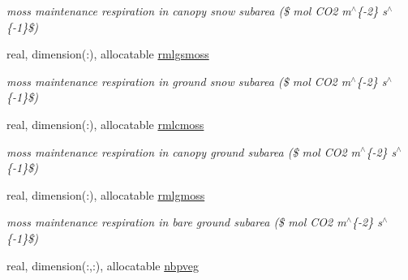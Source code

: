 \begin{DoxyCompactItemize}
\begin{DoxyCompactList}\small\item\em moss maintenance respiration in canopy snow subarea (\$ mol C\+O2 m$^\wedge$\{-\/2\} s$^\wedge$\{-\/1\}\$) \end{DoxyCompactList}\item 
\hypertarget{structctem__statevars_1_1veg__gat_a04946cbc0a0283ebf48af654fe75675a}{}real, dimension(\+:), allocatable \hyperlink{structctem__statevars_1_1veg__gat_a04946cbc0a0283ebf48af654fe75675a}{rmlgsmoss}\label{structctem__statevars_1_1veg__gat_a04946cbc0a0283ebf48af654fe75675a}

\begin{DoxyCompactList}\small\item\em moss maintenance respiration in ground snow subarea (\$ mol C\+O2 m$^\wedge$\{-\/2\} s$^\wedge$\{-\/1\}\$) \end{DoxyCompactList}\item 
\hypertarget{structctem__statevars_1_1veg__gat_a2d27c61781a2828d5e8d2887a41d665e}{}real, dimension(\+:), allocatable \hyperlink{structctem__statevars_1_1veg__gat_a2d27c61781a2828d5e8d2887a41d665e}{rmlcmoss}\label{structctem__statevars_1_1veg__gat_a2d27c61781a2828d5e8d2887a41d665e}

\begin{DoxyCompactList}\small\item\em moss maintenance respiration in canopy ground subarea (\$ mol C\+O2 m$^\wedge$\{-\/2\} s$^\wedge$\{-\/1\}\$) \end{DoxyCompactList}\item 
\hypertarget{structctem__statevars_1_1veg__gat_a9349282a5315f549d16b04d8c55f1cb7}{}real, dimension(\+:), allocatable \hyperlink{structctem__statevars_1_1veg__gat_a9349282a5315f549d16b04d8c55f1cb7}{rmlgmoss}\label{structctem__statevars_1_1veg__gat_a9349282a5315f549d16b04d8c55f1cb7}

\begin{DoxyCompactList}\small\item\em moss maintenance respiration in bare ground subarea (\$ mol C\+O2 m$^\wedge$\{-\/2\} s$^\wedge$\{-\/1\}\$) \end{DoxyCompactList}\item 
\hypertarget{structctem__statevars_1_1veg__gat_aeea0970f5288e4b7bfced83715d5b8e5}{}real, dimension(\+:,\+:), allocatable \hyperlink{structctem__statevars_1_1veg__gat_aeea0970f5288e4b7bfced83715d5b8e5}{nbpveg}\label{structctem__statevars_1_1veg__gat_aeea0970f5288e4b7bfced83715d5b8e5}


\end{DoxyCompactItemize}
